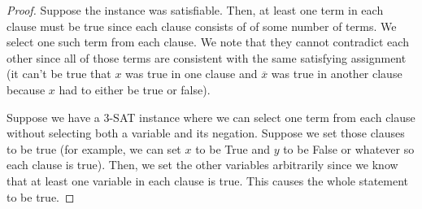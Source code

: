 \documentclass[letterpaper]{article}
\begin{document}
\begin{mdframed}[]
    \begin{proof}
        Suppose the instance was satisfiable. Then, at least one term in each clause must be true since each clause consists of  of some number of terms. We select one such term from each clause. We note that they cannot contradict each other since all of those terms are consistent with the same satisfying assignment (it can't be true that $x$ was true in one clause and $\overline{x}$ was true in another clause because $x$ had to either be true or false).

        \bigskip 

        Suppose we have a 3-SAT instance where we can select one term from each clause without selecting both a variable and its negation. Suppose we set those clauses to be true (for example, we can set $x$ to be True and $y$ to be False or whatever so each clause is true). Then, we set the other variables arbitrarily since we know that at least one variable in each clause is true. This causes the whole statement to be true. 
    \end{proof}
\end{mdframed}
\end{document}
